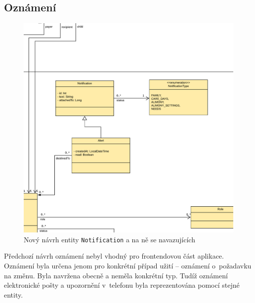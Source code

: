     \subsection{Oznámení}\label{navrh:upravy:notification}
        \begin{figure}\centering
	       \includegraphics[width=1.0\textwidth]{pdfs/Notification2}
	       \caption[Nový návrh oznámení]{Nový návrh entity \texttt{Notification} a na ně se navazujících}\label{image:notification2}
        \end{figure}
        Předchozí návrh oznámení nebyl vhodný pro frontendovou část aplikace. Oznámení byla určena jenom pro konkrétní případ užití -- oznámení o~požadavku na změnu. Byla navržena obecně a neměla konkrétní typ. Tudíž oznámení elektronické pošty a upozornění v~telefonu byla reprezentována pomocí stejné entity.
        
